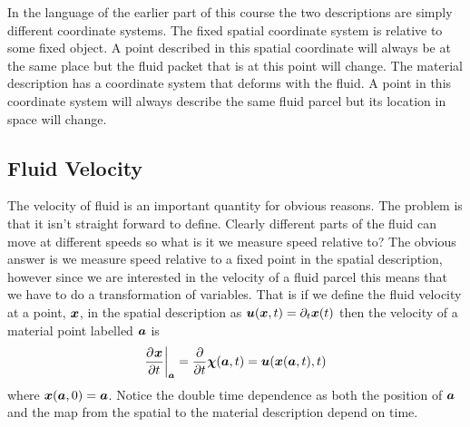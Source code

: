 \documentclass[a4paper]{article}
\begin{document}
    In the language of the earlier part of this course the two descriptions are simply different coordinate systems.
    The fixed spatial coordinate system is relative to some fixed object.
    A point described in this spatial coordinate will always be at the same place but the fluid packet that is at this point will change.
    The material description has a coordinate system that deforms with the fluid.
    A point in this coordinate system will always describe the same fluid parcel but its location in space will change.
    
    \subsection{Fluid Velocity}
    The velocity of fluid is an important quantity for obvious reasons.
    The problem is that it isn't straight forward to define.
    Clearly different parts of the fluid can move at different speeds so what is it we measure speed relative to?
    The obvious answer is we measure speed relative to a fixed point in the spatial description, however since we are interested in the velocity of a fluid parcel this means that we have to do a transformation of variables.
    That is if we define the fluid velocity at a point, \(\bm{x}\), in the spatial description as \(\bm{u}(\bm{x}, t) = \partial_t\bm{x}(t)\) then the velocity of a material point labelled \(\bm{a}\) is
    \[\pdv[]{\bm{x}}{t}\biggr|_{\bm{a}} = \pdv{t}\bm{\chi}(\bm{a}, t) = \bm{u}(\bm{x}(\bm{a}, t), t)\]
    where \(\bm{x}(\bm{a}, 0) = \bm{a}\).
    Notice the double time dependence as both the position of \(\bm{a}\) and the map from the spatial to the material description depend on time.
    
\end{document}
